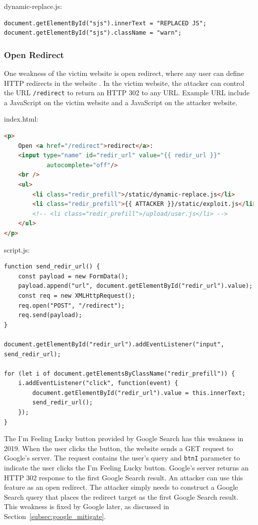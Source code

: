 \documentclass[conference]{IEEEtran}
\begin{document}
dynamic-replace.js:
\begin{lstlisting}
document.getElementById("sjs").innerText = "REPLACED JS";
document.getElementById("sjs").className = "warn";
\end{lstlisting}

\subsubsection{Open Redirect}

One weakness of the victim website is open redirect, where any user can define HTTP redirects in the website \cite{cwe_open_redir}. In the victim website, the attacker can control the URL \lstinline{/redirect} to return an HTTP 302 to any URL. Example URL include a JavaScript on the victim website and a JavaScript on the attacker website.

index.html:
\begin{lstlisting}[language=HTML]
<p>
    Open <a href="/redirect">redirect</a>:
    <input type="name" id="redir_url" value="{{ redir_url }}"
            autocomplete="off"/>
    <br />
    <ul>
        <li class="redir_prefill">/static/dynamic-replace.js</li>
        <li class="redir_prefill">{{ ATTACKER }}/static/exploit.js</li>
        <!-- <li class="redir_prefill">/upload/user.js</li> -->
    </ul>
</p>
\end{lstlisting}

script.js:
\begin{lstlisting}
function send_redir_url() {
	const payload = new FormData();
	payload.append("url", document.getElementById("redir_url").value);
	const req = new XMLHttpRequest();
	req.open("POST", "/redirect");
	req.send(payload);
}

document.getElementById("redir_url").addEventListener("input", send_redir_url);

for (let i of document.getElementsByClassName("redir_prefill")) {
	i.addEventListener("click", function(event) {
		document.getElementById("redir_url").value = this.innerText;
		send_redir_url();
	});
}
\end{lstlisting}

The I'm Feeling Lucky button provided by Google Search has this weakness in 2019. When the user clicks the button, the website sends a GET request to Google's server. The request contains the user's query and \lstinline{btnI} parameter to indicate the user clicks the I'm Feeling Lucky button. Google's server returns an HTTP 302 response to the first Google Search result. An attacker can use this feature as an open redirect. The attacker simply needs to construct a Google Search query that places the redirect target as the first Google Search result. This weakness is fixed by Google later, as discussed in Section~\ref{subsec:google_mitigate}.
\end{document}
